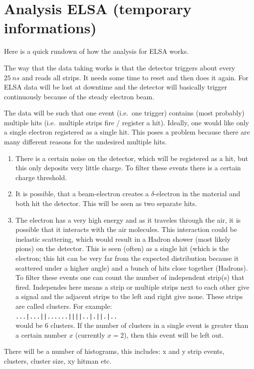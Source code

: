 \documentclass[sn-mathphys-num,iicol]{sn-jnl}
\theoremstyle{thmstyleone}
\theoremstyle{thmstyletwo}
\theoremstyle{thmstylethree}
\begin{document}
\clearpage
\section{Analysis ELSA (\textbf{temporary informations})}
Here is a quick rundown of how the analysis for ELSA works.

The way that the data taking works is that the detector triggers about every $\SI{25}{ns}$ and reads all strips.
It needs some time to reset and then does it again.
For ELSA data will be lost at downtime and the detector will basically trigger continuously because of the steady electron beam.

The data will be such that one event (i.e.\ one trigger) contains (most probably) multiple hits (i.e.\ multiple strips fire / register a hit).
Ideally, one would like only a single electron registered as a single hit.
This poses a problem because there are many different reasons for the undesired multiple hits.
\begin{enumerate}[label=\arabic*)]
  \item There is a certain noise on the detector, which will be registered as a hit, but this only deposits very little charge.
    To filter these events there is a certain charge threshold.
  \item It is possible, that a beam-electron creates a $\delta $-electron in the material and both hit the detector.
    This will be seen as two separate hits.
  \item The electron has a very high energy and as it traveles through the air, it is possible that it interacts with the air molecules.
    This interaction could be inelastic scattering, which would result in a Hadron shower (most likely pions) on the detector.
    This is seen (often) as a single hit (which is the electron; this hit can be very far from the expected distribution because it scattered under a higher angle) and a bunch of hits close together (Hadrons).
    To filter these events one can count the number of independent strip(s) that fired.
    Independes here means a strip or multiple strips next to each other give a signal and the adjacent strips to the left and right give none.
    These strips are called clusters.
    For example: \\\texttt{...|...||......||||..|.||.|..}\\
    would be 6 clusters.
    If the number of clusters in a single event is greater than a certain number $x$ (currently $x=2$), then this event will be left out.
\end{enumerate}
There will be a number of histograms, this includes: x and y strip events, clusters, cluster size, xy hitman etc.\
\end{document}
